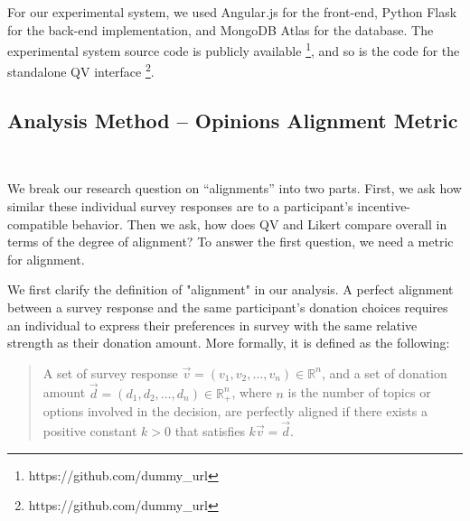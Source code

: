For our experimental system, we used Angular.js for the front-end, Python Flask for the back-end implementation, and MongoDB Atlas for the database. The experimental system source code is publicly available \footnote{https://github.com/dummy\_url}, and so is the code for the standalone QV interface \footnote{https://github.com/dummy\_url}. 



\subsection{Analysis Method -- Opinions Alignment Metric}~\label{alignment_metric}

We break our research question on ``alignments'' into two parts. First, we ask how similar these individual survey responses are to a participant's incentive-compatible behavior. Then we ask, how does QV and Likert compare overall in terms of the degree of alignment? To answer the first question, we need a metric for alignment.

We first clarify the definition of "alignment" in our analysis. A perfect alignment between a survey response and the same participant's donation choices requires an individual to express their preferences in survey with the same relative strength as their donation amount. More formally, it is defined as the following:

\begin{quote}
    A set of survey response $\vec{v} = (v_1, v_2, \dots, v_n) \in \mathbb{R}^n$, and a set of donation amount $\vec{d} = (d_1, d_2, \dots, d_n)\in \mathbb{R}_{+}^n$, where $n$ is the number of topics or options involved in the decision, are perfectly aligned if there exists a positive constant $k>0$ that satisfies $k\vec{v} = \vec{d}$.
\end{quote}

